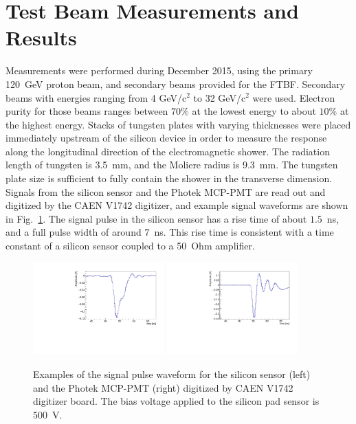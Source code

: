 \documentclass[preprint,1p]{elsarticle}
\begin{document}
\section{Test Beam Measurements and Results} 
\label{sec:results} 

Measurements were performed during December 2015, using the primary 120~GeV proton beam, and secondary
beams provided for the FTBF. Secondary beams with energies ranging from 4
GeV/c$^2$ to 32 GeV/c$^2$ were used. Electron purity for those beams ranges
between $70\%$ at the lowest energy to about $10\%$ at the highest energy.
Stacks of tungsten plates with varying thicknesses were placed immediately
upstream of the silicon device in order to measure the response along the
longitudinal direction of the electromagnetic shower. The radiation length of
tungsten is 3.5~mm, and the Moliere radius is 9.3~mm. The tungsten plate size is
sufficient to fully contain the shower in the transverse dimension. Signals from
the silicon sensor and the Photek MCP-PMT are read out and digitized by the CAEN
V1742 digitizer, and example signal waveforms are shown in
Fig.~\ref{fig:pulses}. The signal pulse in the silicon sensor has a rise time of
about $1.5$~ns, and a full pulse width of around $7$~ns. This rise time is
consistent with a time constant of a silicon sensor coupled to a 50~Ohm amplifier.

\begin{figure}[htbp] 
\centering
\includegraphics[width=0.45\textwidth]{plots/ExampleSiliconPadPulse_6X0_16GeV.pdf} 
\includegraphics[width=0.45\textwidth]{plots/ExamplePhotekPulse.pdf} 
\caption{Examples of the signal pulse waveform for the silicon sensor (left) and
the Photek MCP-PMT (right) digitized by CAEN V1742 digitizer board. The bias
voltage applied to the silicon pad sensor is~$500$~V.} 
\label{fig:pulses} 
\end{figure} 
\end{document}
